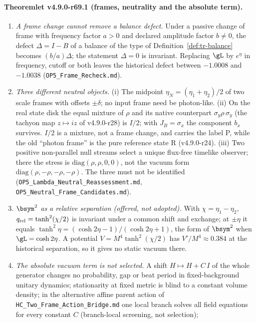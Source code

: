 \paragraph{Theoremlet v4.9.0-r69.1 (frames, neutrality and the absolute term).}
\begin{enumerate}[leftmargin=2em]
\item[(a)] \emph{A frame change cannot remove a balance defect.}  Under a passive change of frame with frequency factor \(a>0\) and declared amplitude
factor \(b\neq0\), the defect \(\Delta=I-B\) of a balance of the type of Definition~\ref{def:tr-balance} becomes \((b/a)\Delta\); the statement
\(\Delta=0\) is invariant.  Replacing \(\gL\) by \(e^{\eta}\) in frequency, cutoff or both leaves the historical defect between \(-1.0008\) and \(-1.0038\)
(\texttt{OP5\_Frame\_Recheck.md}).
\item[(b)] \emph{Three different neutral objects.}  (i) The midpoint \(\eta_N=(\eta_1+\eta_2)/2\) of two scale frames with offsets \(\pm\delta\); no input frame
need be photon-like.  (ii) On the real state disk the equal mixture of \(\rho\) and its native counterpart \(\sigma_y\rho\,\sigma_y\) (the tachyon map
\(z\mapsto iz\) of v4.9.0-r28) is \(I/2\); with \(J_B=\sigma_x\) the component \(b_x\) survives.  \(I/2\) is a mixture, not a frame change, and carries the label P,
while the old ``photon frame'' is the pure reference state R (v4.9.0-r24).  (iii) Two positive non-parallel null streams select a unique flux-free timelike
observer; there the stress is \(\mathrm{diag}(\rho,\rho,0,0)\), not the vacuum form \(\mathrm{diag}(\rho,-\rho,-\rho,-\rho)\).  The three must not be identified
(\texttt{OP5\_Lambda\_Neutral\_Reassessment.md}, \texttt{OP5\_Neutral\_Frame\_Candidates.md}).
\item[(c)] \emph{\(\bsym^2\) as a relative separation (offered, not adopted).}  With \(\chi=\eta_1-\eta_2\), \(q_{\rm rel}=\tanh^2(\chi/2)\) is invariant under a
common shift and exchange; at \(\pm\eta\) it equals \(\tanh^2\eta=(\cosh2\eta-1)/(\cosh2\eta+1)\), the form of \(\bsym^2\) when \(\gL=\cosh2\eta\).  A potential
\(V=M^4\tanh^2(\chi/2)\) has \(V'/M^4\approx0.384\) at the historical separation, so it gives no static vacuum there.
\item[(d)] \emph{The absolute vacuum term is not selected.}  A shift \(H\mapsto H+C\,I\) of the whole generator changes no probability, gap or beat period
in fixed-background unitary dynamics; stationarity at fixed metric is blind to a constant volume density; in the alternative affine parent action of
\texttt{HC\_Two\_Frame\_Action\_Bridge.md} one local branch solves all field equations for every constant \(C\) (branch-local screening, not selection);

\end{enumerate}
